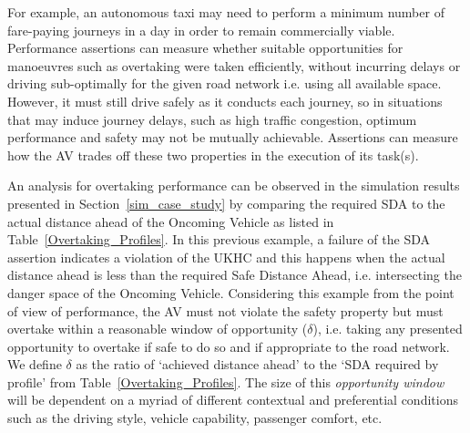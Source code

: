 For example, an autonomous taxi may need to perform a minimum number of fare-paying journeys in a day in order to remain commercially viable. Performance assertions can measure whether suitable opportunities for manoeuvres such as overtaking were taken efficiently, without incurring delays or driving sub-optimally for the given road network i.e. using all available space. However, it must still drive safely as it conducts each journey, so in situations that may induce journey delays, such as high traffic congestion, optimum performance and safety may not be mutually achievable. Assertions can measure how the AV trades off these two properties in the execution of its task(s).

An analysis for overtaking performance can be observed in the simulation results presented in Section~\ref{sim_case_study} by comparing the required SDA to the actual distance ahead of the Oncoming Vehicle as listed in Table~\ref{Overtaking_Profiles}. In this previous example, a failure of the SDA assertion indicates a violation of the UKHC and this happens when the actual distance ahead is less than the required Safe Distance Ahead, i.e. intersecting the danger space of the Oncoming Vehicle. Considering this example from the point of view of performance, the AV must not violate the safety property but must overtake within a reasonable window of opportunity ($\delta$), i.e. taking any presented opportunity to overtake if safe to do so and if appropriate to the road network. We define $\delta$ as the ratio of `achieved distance ahead' to the `SDA required by profile' from Table~\ref{Overtaking_Profiles}. The size of this \emph{opportunity window} will be dependent on a myriad of different contextual and preferential conditions such as the driving style, vehicle capability, passenger comfort, etc. 


